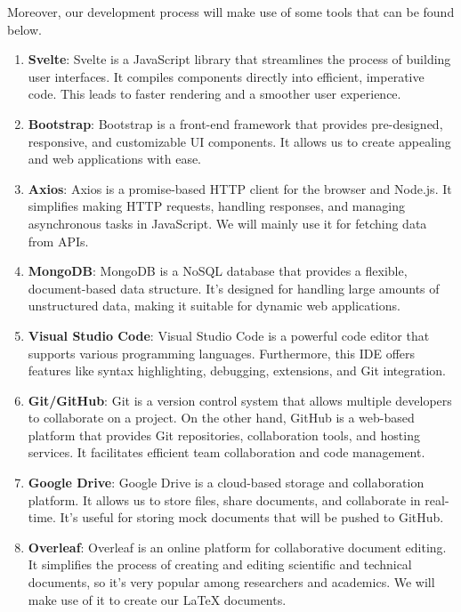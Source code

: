 \documentclass[conference]{IEEEtran}
\begin{document}
Moreover, our development process will make use of some tools that can be found below.
\begin{enumerate}
    \item \textbf{Svelte}: Svelte is a JavaScript library that streamlines the process of building user interfaces. It compiles components directly into efficient, imperative code. This leads to faster rendering and a smoother user experience.
    \item \textbf{Bootstrap}: Bootstrap is a front-end framework that provides pre-designed, responsive, and customizable UI components. It allows us to create appealing and web applications with ease.
    \item \textbf{Axios}: Axios is a promise-based HTTP client for the browser and Node.js. It simplifies making HTTP requests, handling responses, and managing asynchronous tasks in JavaScript. We will mainly use it for fetching data from APIs.
    \item \textbf{MongoDB}: MongoDB is a NoSQL database that provides a flexible, document-based data structure. It's designed for handling large amounts of unstructured data, making it suitable for dynamic web applications.
    \item \textbf{Visual Studio Code}: Visual Studio Code is a powerful code editor that supports various programming languages. Furthermore, this IDE offers features like syntax highlighting, debugging, extensions, and Git integration.
    \item \textbf{Git/GitHub}: Git is a version control system that allows multiple developers to collaborate on a project. On the other hand, GitHub is a web-based platform that provides Git repositories, collaboration tools, and hosting services. It facilitates efficient team collaboration and code management.
    \item \textbf{Google Drive}: Google Drive is a cloud-based storage and collaboration platform. It allows us to store files, share documents, and collaborate in real-time. It's useful for storing mock documents that will be pushed to GitHub.
    \item \textbf{Overleaf}: Overleaf is an online platform for collaborative document editing. It simplifies the process of creating and editing scientific and technical documents, so it’s very popular among researchers and academics. We will make use of it to create our LaTeX documents.
\end{enumerate}
\end{document}
